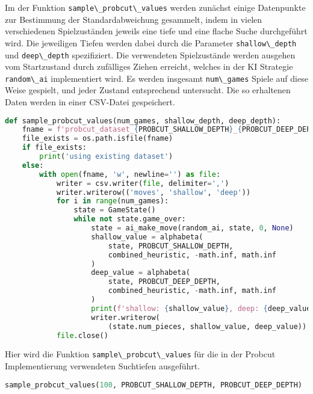 Im der Funktion \passthrough{\lstinline!sample\_probcut\_values!} werden
zunächst einige Datenpunkte zur Bestimmung der Standardabweichung
gesammelt, indem in vielen verschiedenen Spielzuständen jeweils eine
tiefe und eine flache Suche durchgeführt wird. Die jeweiligen Tiefen
werden dabei durch die Parameter
\passthrough{\lstinline!shallow\_depth!} und
\passthrough{\lstinline!deep\_depth!} spezifiziert. Die verwendeten
Spielzustände werden ausgehen vom Startzustand durch zufälliges Ziehen
erreicht, welches in der KI Strategie
\passthrough{\lstinline!random\_ai!} implementiert wird. Es werden
insgesamt \passthrough{\lstinline!num\_games!} Spiele auf diese Weise
gespielt, und jeder Zustand entsprechend untersucht. Die so erhaltenen
Daten werden in einer CSV-Datei gespeichert.

\begin{lstlisting}[language=Python]
def sample_probcut_values(num_games, shallow_depth, deep_depth):
    fname = f'probcut_dataset_{PROBCUT_SHALLOW_DEPTH}_{PROBCUT_DEEP_DEPTH}.csv'
    file_exists = os.path.isfile(fname)
    if file_exists:
        print('using existing dataset')
    else:
        with open(fname, 'w', newline='') as file:
            writer = csv.writer(file, delimiter=',')
            writer.writerow(('moves', 'shallow', 'deep'))
            for i in range(num_games):
                state = GameState()
                while not state.game_over:
                    state = ai_make_move(random_ai, state, 0, None)
                    shallow_value = alphabeta(
                        state, PROBCUT_SHALLOW_DEPTH,
                        combined_heuristic, -math.inf, math.inf
                    )
                    deep_value = alphabeta(
                        state, PROBCUT_DEEP_DEPTH,
                        combined_heuristic, -math.inf, math.inf
                    )
                    print(f'shallow: {shallow_value}, deep: {deep_value}')
                    writer.writerow(
                        (state.num_pieces, shallow_value, deep_value))
            file.close()
\end{lstlisting}

Hier wird die Funktion \passthrough{\lstinline!sample\_probcut\_values!}
für die in der Probcut Implementierung verwendeten Suchtiefen
ausgeführt.

\begin{lstlisting}[language=Python]
sample_probcut_values(100, PROBCUT_SHALLOW_DEPTH, PROBCUT_DEEP_DEPTH)
\end{lstlisting}

